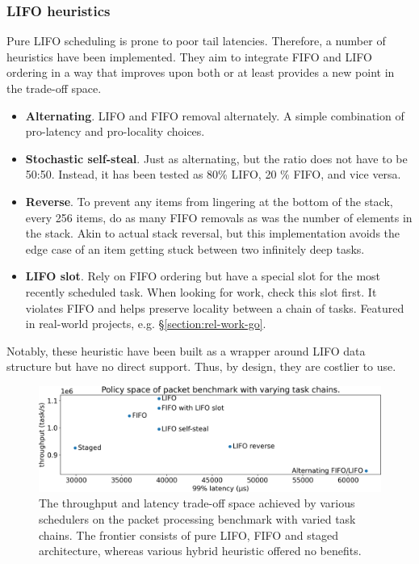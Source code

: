 \documentclass[12pt,a4paper,twoside]{report}
\begin{document}
\subsubsection{LIFO heuristics}
\label{section:lifo-heuristics}

Pure LIFO scheduling is prone to poor tail latencies. Therefore, a number of heuristics have been implemented. They aim to integrate FIFO and LIFO ordering in a way that improves upon both or at least provides a new point in the trade-off space.
\begin{itemize}
    \item \textbf{Alternating}. LIFO and FIFO removal alternately. A simple combination of pro-latency and pro-locality choices. 
    \item \textbf{Stochastic self-steal}. Just as alternating, but the ratio does not have to be 50:50. Instead, it has been tested as 80\% LIFO, 20 \% FIFO, and vice versa.  
    \item \textbf{Reverse}. To prevent any items from lingering at the bottom of the stack, every 256 items, do as many FIFO removals as was the number of elements in the stack. Akin to actual stack reversal, but this implementation avoids the edge case of an item getting stuck between two infinitely deep tasks.
    \item \textbf{LIFO slot}. Rely on FIFO ordering but have a special slot for the most recently scheduled task. When looking for work, check this slot first. It violates FIFO and helps preserve locality between a chain of tasks. Featured in real-world projects, e.g. \S\ref{section:rel-work-go}. 
\end{itemize}
Notably, these heuristic have been built as a wrapper around LIFO data structure but have no direct support. Thus, by design, they are costlier to use. 

\begin{figure} 
    \centering 
    \includegraphics[width=1\textwidth]{eval/packet-basic-base-hybrids.png}
    \caption{The throughput and latency trade-off space achieved by various schedulers on the packet processing benchmark with varied task chains. The frontier consists of pure LIFO, FIFO and staged architecture, whereas various hybrid heuristic offered no benefits.}
   \label{fig:packet-hybrids}
\end{figure}
\end{document}
